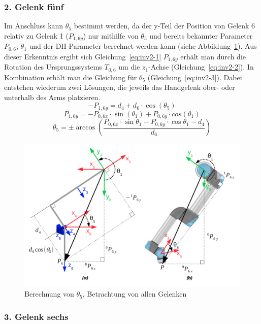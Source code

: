 \subsubsection{2. Gelenk fünf}

Im Anschluss kann $\theta_5$ bestimmt werden, da der y-Teil der Position von Gelenk 6 relativ zu Gelenk 1 ($P_{1,6y}$) nur mithilfe von $\theta_5$ und bereits bekannter Parameter $P_{0,6}$, $\theta_1$ und der DH-Parameter berechnet werden kann (siehe Abbildung~\ref{fig:inv1-2}).
Aus dieser Erkenntnis ergibt sich Gleichung~\ref{eq:inv2-1}
$P_{1,6y}$ erhält man durch die Rotation des Ursprungssystems $T_{0,6}$ um die $z_1$-Achse (Gleichung~\ref{eq:inv2-2}).
In Kombination erhält man die Gleichung für $\theta_5$ (Gleichung~\ref{eq:inv2-3}).
Dabei entstehen wiederum zwei Lösungen, die jeweils das Handgelenk ober- oder unterhalb des Arms platzieren.
\begin{equation}
    - P_{1,6y} = d_4 + d_6 \cdot \cos(\theta_5)
    \label{eq:inv2-1}
\end{equation}
\begin{equation}
    P_{1,6y} = - P_{0,6x} \cdot \sin(\theta_1) + P_{0,6y} \cdot cos(\theta_1)
    \label{eq:inv2-2}
\end{equation}
\begin{equation}
    \theta_5 = \pm \arccos \left( \frac{ P_{0,6x} \cdot \sin\theta_1 - P_{0,6y} \cdot \cos\theta_1 - d_4 }{ d_6 } \right)
    \label{eq:inv2-3}
\end{equation}
\begin{figure}[h]
    \centering
    \includegraphics[width = .5\textwidth]{Bilder/inv2}
    \caption{Berechnung von $\theta_5$, Betrachtung von allen Gelenken~\cite{rasmusandersenKinematicsUR52018}}\label{fig:inv1-2}
\end{figure}

\subsubsection{3. Gelenk sechs}

